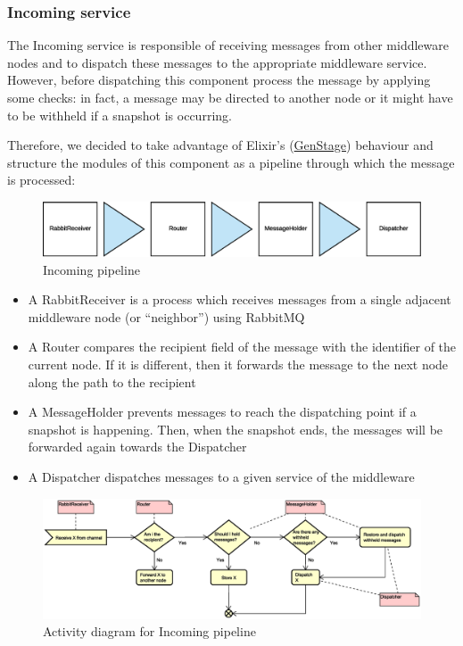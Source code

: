 \subsubsection{Incoming service}
The Incoming service is responsible of receiving messages from other
middleware nodes and to dispatch these messages to the appropriate middleware
service.
However, before dispatching this component process the message by applying some
checks: in fact, a message may be directed to another node or it might have to
be withheld if a snapshot is occurring.

Therefore, we decided to take advantage of Elixir's
(\href{https://hexdocs.pm/gen_stage/GenStage.html}{GenStage}) behaviour and
structure the modules of this component as a pipeline through which the
message is processed:

\begin{figure}[H]
  \centering
  \includegraphics[width=\columnwidth]{images/solution/mw/inc/architect.eps}
  \caption{Incoming pipeline}
  \label{fig:mw-incoming}
\end{figure}

\begin{itemize}
  \item A RabbitReceiver is a process which receives messages from a single
    adjacent middleware node (or ``neighbor'') using RabbitMQ
  \item A Router compares the recipient field of the message with the
    identifier of the current node. If it is different, then it forwards the
    message to the next node along the path to the recipient
  \item A MessageHolder prevents messages to reach the dispatching point if a
    snapshot is happening. Then, when the snapshot ends, the messages will be
    forwarded again towards the Dispatcher
  \item A Dispatcher dispatches messages to a given service of the middleware
\end{itemize}

\begin{figure}[H]
  \centering
  \includegraphics[width=\columnwidth]{images/solution/mw/inc/activity.eps}
  \caption{Activity diagram for Incoming pipeline}
  \label{fig:mw-incoming-activity}
\end{figure}

